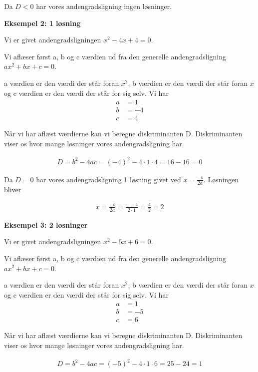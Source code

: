 Da $D < 0$ har vores andengradsligning ingen løsninger.



\textbf{Eksempel 2: 1 løsning} 

Vi er givet andengradsligningen $x^2 - 4x + 4 = 0$.

Vi aflæser først a, b og c værdien ud fra den generelle andengradsligning $ax^2 + bx + c = 0$.

a værdien er den værdi der står foran $x^2$, b værdien er den værdi der står foran $x$ og c værdien er den værdi der står for sig selv. Vi har
\begin{align*}
a &= 1\\
b &= -4\\
c &= 4
\end{align*}

Når vi har aflæst værdierne kan vi beregne diskriminanten D. Diskriminanten viser os hvor mange løsninger vores andengradsligning har.

\begin{align*}
D = b^2 - 4ac = (-4)^2 - 4 \cdot 1 \cdot 4 = 16 - 16 = 0
\end{align*}

Da $D = 0$ har vores andengradsligning 1 løsning givet ved $x = \frac{-b}{2a}$.
Løsningen bliver

\begin{align*}
x = \frac{-b}{2a} =\frac{--4}{2\cdot 1} = \frac{4}{2} = 2
\end{align*}


\textbf{Eksempel 3: 2 løsninger}

Vi er givet andengradsligningen $x^2 - 5x + 6 = 0$.

Vi aflæser først a, b og c værdien ud fra den generelle andengradsligning $ax^2 + bx + c = 0$.

a værdien er den værdi der står foran $x^2$, b værdien er den værdi der står foran $x$ og c værdien er den værdi der står for sig selv. Vi har
\begin{align*}
a &= 1\\
b &= -5\\
c &= 6
\end{align*}

Når vi har aflæst værdierne kan vi beregne diskriminanten D. Diskriminanten viser os hvor mange løsninger vores andengradsligning har.

\begin{align*}
D = b^2 - 4ac = (-5)^2 - 4 \cdot 1 \cdot 6 = 25 - 24 = 1
\end{align*}

